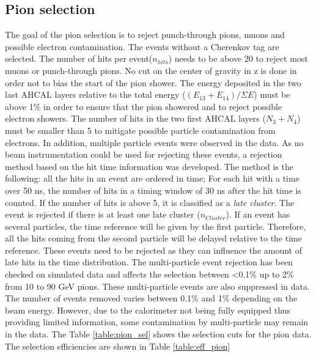 \documentclass{JINST}
\begin{document}
\subsection{Pion selection}
\label{sec:pionsel}

The goal of the pion selection is to reject punch-through pions, muons and possible electron contamination. The events without a Cherenkov tag are selected. The number of hits per event($n_{hits}$) needs to be above 20 to reject most muons or punch-through pions. No cut on the center of gravity in z is done in order not to bias the start of the pion shower. The energy deposited in the two last AHCAL layers relative to the total energy ($(E_{13}+E_{14})/\Sigma E$) must be above 1\% in order to ensure that the pion showered and to reject possible electron showers. The number of hits in the two first AHCAL layers ($N_3+N_4$) must be smaller than 5 to mitigate possible particle contamination from electrons. In addition, multiple particle events were observed in the data. As no beam instrumentation could be used for rejecting these events, a rejection method based on the hit time information was developed. The method is the following: all the hits in an event are ordered in time; For each hit with a time over 50 ns, the number of hits in a timing window of 30 ns after the hit time is counted. If the number of hits is above 5, it is classified as a \textit{late cluster}. The event is rejected if there is at least one late cluster ($n_{Cluster}$). If an event has several particles, the time reference will be given by the first particle. Therefore, all the hits coming from the second particle will be delayed relative to the time reference. These events need to be rejected as they can influence the amount of late hits in the time distribution. The multi-particle event rejection has been checked on simulated data and affects the selection between <0.1\% up to 2\% from 10 to 90 GeV pions. These multi-particle events are also suppressed in data. The number of events removed varies between 0.1\% and 1\% depending on the beam energy. However, due to the calorimeter not being fully equipped thus providing limited information, some contamination by multi-particle may remain in the data. The Table \ref{table:pion_sel} shows the selection cuts for the pion data. The selection efficiencies are shown in Table \ref{table:eff_pion}
\end{document}
